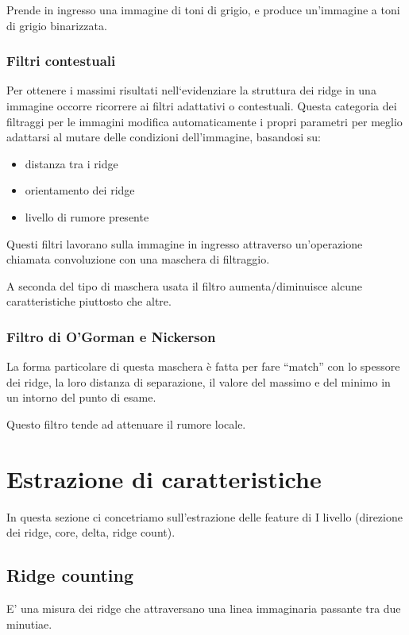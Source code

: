 Prende in ingresso una immagine di toni di grigio, e produce un'immagine 
a toni di grigio binarizzata.

\subsubsection{Filtri contestuali}

Per ottenere i massimi risultati nell‘evidenziare la
struttura dei ridge in una immagine occorre ricorrere ai
filtri adattativi o contestuali. Questa categoria dei filtraggi per le immagini modifica
automaticamente i propri parametri per meglio adattarsi
al mutare delle condizioni dell’immagine, basandosi su:
\begin{itemize}
    \item distanza tra i ridge
    \item orientamento dei ridge
    \item livello di rumore presente
\end{itemize}

Questi filtri lavorano sulla immagine in ingresso
attraverso un’operazione chiamata convoluzione con una
maschera di filtraggio.

A seconda del tipo di maschera usata il filtro
aumenta/diminuisce alcune caratteristiche piuttosto che
altre.

\subsubsection{Filtro di O'Gorman e Nickerson}

La forma particolare di questa maschera è fatta per fare
“match” con lo spessore dei ridge, la loro distanza di
separazione, il valore del massimo e del minimo in un
intorno del punto di esame.

Questo filtro tende ad attenuare il rumore locale.

\section{Estrazione di caratteristiche}

In questa sezione ci concetriamo sull'estrazione delle feature di I livello (direzione dei ridge, core, delta, ridge count).

\subsection{Ridge counting}

E’ una misura dei ridge che attraversano una
linea immaginaria passante tra due minutiae.

